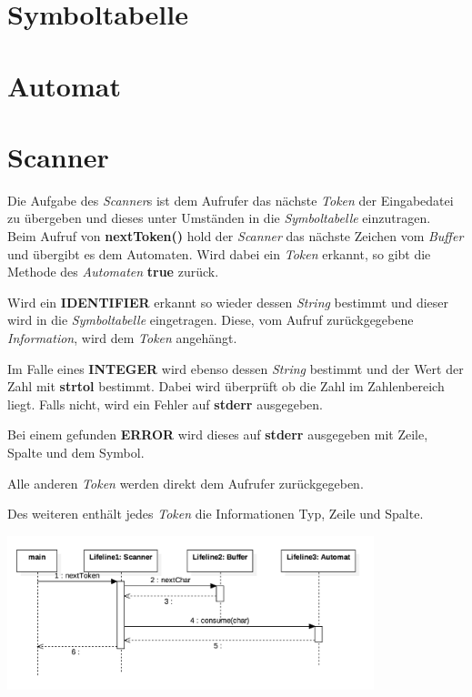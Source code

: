 \documentclass[
    a4paper
]{scrreprt}
\begin{document}
    
    \section{Symboltabelle}
    
    
    \section{Automat}
    
    
    \section{Scanner}
    Die Aufgabe des \textit{Scanner}s ist dem Aufrufer das nächste \textit{Token} der Eingabedatei zu übergeben und dieses unter Umständen in die \textit{Symboltabelle} einzutragen.\\
    
    Beim Aufruf von \textbf{nextToken()} hold der \textit{Scanner} das nächste Zeichen vom \textit{Buffer} und übergibt es dem Automaten. Wird dabei ein \textit{Token} erkannt, so gibt die Methode des \textit{Automaten} \textbf{true} zurück.

	Wird ein \textbf{IDENTIFIER} erkannt so wieder dessen \textit{String} bestimmt und dieser wird in die \textit{Symboltabelle} eingetragen. Diese, vom Aufruf zurückgegebene \textit{Information}, wird dem \textit{Token} angehängt.
	
	Im Falle eines \textbf{INTEGER} wird ebenso dessen \textit{String} bestimmt und der Wert der Zahl mit \textbf{strtol} bestimmt. Dabei wird überprüft ob die Zahl im Zahlenbereich liegt. Falls nicht, wird ein Fehler auf \textbf{stderr} ausgegeben.
	
	Bei einem gefunden \textbf{ERROR} wird dieses auf \textbf{stderr} ausgegeben mit Zeile, Spalte und dem Symbol.
	
	Alle anderen \textit{Token} werden direkt dem Aufrufer zurückgegeben. 
	
	Des weiteren enthält jedes \textit{Token} die Informationen Typ, Zeile und Spalte.
	
	\begin{center}
		\includegraphics[width=0.8\textwidth]{./images/scanner_sequence.png}
	\end{center}
\end{document}
